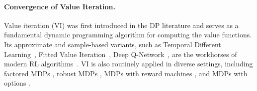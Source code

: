 \documentclass{article} %
\begin{document}

\paragraph{Convergence of Value Iteration.}

Value iteration (VI) was first introduced in the DP literature \citep{bellman1957markovian} and serves as a fundamental dynamic programming algorithm for computing the value functions. Its approximate and sample-based variants, such as Temporal Different Learning~\citep{Sutton1988}, Fitted Value Iteration~\citep{Ernst05,Munos08JMLR}, Deep Q-Network~\citep{MnihKavukcuogluSilveretal2015}, are the workhorses of modern RL algorithms~\citep{Bertsekas96,SuttonBarto2018,SzepesvariBook10}. VI is also routinely applied in diverse settings, including factored MDPs \citep{rosenberg2021oracle}, robust MDPs \citep{kumarefficient}, MDPs with reward machines \citep{bourel2023exploration}, and MDPs with options \citep{fruit2017regret}.
\end{document}
